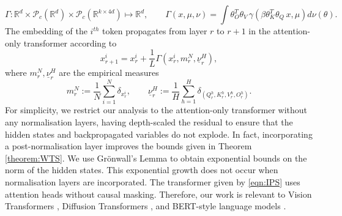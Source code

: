 \documentclass{article}
\newcommand{\R}{\mathbb{R}}
\begin{document}
\begin{equation}\label{eqn:Gamma}
\Gamma:\R^d\times \mathcal P_c(\R^d)\times \mathcal P_c(\R^{k\times 4d}) \mapsto \R^d, \qquad
    \Gamma(x,\mu,\nu) =  \int \theta_O^T\theta_V\,\gamma\left(\beta \theta_K^T\theta_Q\,x,\mu\right)d\nu(\theta).
\end{equation}
The embedding of the $i^{th}$ token propagates from layer $r$ to $r+1$ in the attention-only transformer according to
\begin{equation}\label{eqn:IPS}
    x^i_{r+1} = x_{r}^i+\frac{1}{L}\Gamma\left(x^i_r,m^N_r,\underline{\nu}^H_r\right),
\end{equation}
where $m^N_r, \underline{\nu}^H_r$ are the empirical measures
\begin{equation}\label{eqn:nu_H}
    m^N_r := \frac{1}{N}\sum_{i=1}^N\delta_{x^i_r}, \qquad \underline{\nu}^H_r:= \frac{1}{H}\sum_{h=1}^H \delta_{(Q^h_r,K^h_r,V^h_r,O^h_r)}.
    \end{equation}
 For simplicity, we restrict our analysis to the attention-only transformer without any normalisation layers, having depth-scaled the residual to ensure that the hidden states and backpropagated variables do not explode. In fact, incorporating a post-normalisation layer \cite{xiong2020layernormalizationtransformerarchitecture} improves the bounds given in Theorem \ref{theorem:WTS}. We use Gr\"onwall's Lemma to obtain exponential bounds on the norm of the hidden states. This exponential growth does not occur when normalisation layers are incorporated. The transformer given by \eqref{eqn:IPS} uses attention heads without causal masking. Therefore, our work is relevant to Vision Transformers \cite{dosovitskiy2021imageworth16x16words}, Diffusion Transformers \cite{peebles2023scalable}, and BERT-style language models \cite{devlin2019bert}.
\end{document}
